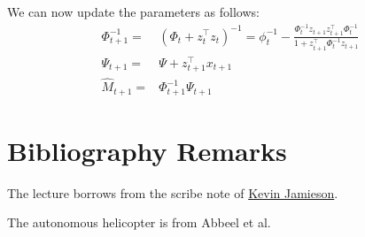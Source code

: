 We can now update the parameters as follows:
\begin{align*}
\Phi_{t+1}^{-1}=&(\Phi_t+z_t^\top z_t)^{-1} =
\phi_t^{-1}-\frac{\Phi_t^{-1}z_{t+1}z_{t+1}^\top\Phi_t^{-1}}{1+z_{t+1}^\top\Phi_t^{-1}z_{t+1}}\\
\Psi_{t+1}=&\Psi+z_{t+1}^\top x_{t+1}\\
\hat{M}_{t+1}=&\Phi_{t+1}^{-1}\Psi_{t+1}
\end{align*}



\section{Bibliography Remarks}

The lecture borrows from the scribe note of
\href{https://courses.cs.washington.edu/courses/cse599i/18wi/resources/lecture20/lecture20.pdf}{Kevin
Jamieson}.


The autonomous helicopter is from Abbeel et al. \cite{AbbeelCN2010}



